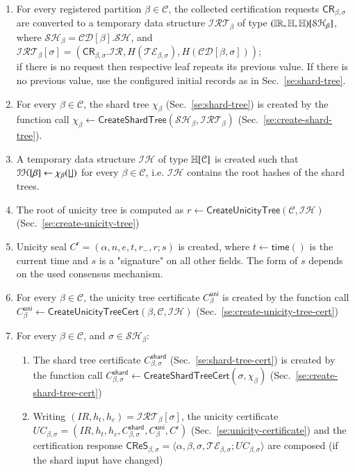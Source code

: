 \begin{enumerate}
	\item For every registered partition $\beta\in\mathcal{C}$, the collected certification requests $\mathsf{CR}_{\beta,\sigma}$ are converted to a temporary data structure $\mathcal{IRT}_\beta$ of type $(\mathbb{IR},\mathbb{H},\mathbb{H})[\mathcal{SH}_\beta]$, where $\mathcal{SH}_\beta=\mathcal{CD}[\beta].\mathcal{SH}$,
	and $\mathcal{IRT}_\beta[\sigma]=(\mathsf{CR}_{\beta,\sigma}.\mathcal{IR}, H(\mathcal{TE}_{\beta,\sigma}),H(\mathcal{CD}[\beta,\sigma]))$; \\
	if there is no request then respective leaf repeats its previous value. If there is no previous value, use the configured initial records as in Sec.~\ref{se:shard-tree}.
	\item For every $\beta\in\mathcal{C}$, the shard tree $\chi_\beta$  (Sec.~\ref{se:shard-tree}) is created by the function call $\chi_\beta\gets\mathsf{CreateShardTree}(\mathcal{SH}_\beta,\mathcal{IRT}_\beta)$ (Sec.~\ref{se:create-shard-tree}).
	\item A temporary data structure $\mathcal{IH}$ of type $\mathbb{H}[\mathcal{C}]$ is created such that $\mathcal{IH}[\beta]\gets \chi_\beta(\lfloor\!\rfloor)$ for every $\beta\in\mathcal{C}$, i.e. $\mathcal{IH}$ contains the root hashes of the shard trees.
	\item The root of unicity tree is computed as $r \gets \mathsf{CreateUnicityTree}(\mathcal{C}, \mathcal{IH})$ (Sec.~\ref{se:create-unicity-tree})
	\item Unicity seal $C^\mathsf{r}=(\alpha, n, e, t, r_-,r; s )$ is created, where $t\gets\mathsf{time}()$ is the current time and $s$ is a "signature" on all other fields. The form of $s$ depends on the used consensus mechanism.
	\item For every $\beta\in\mathcal{C}$, the unicity tree certificate $C^\mathsf{uni}_\beta$ is created by the function call $C^\mathsf{uni}_\beta\gets \mathsf{CreateUnicityTreeCert}(\beta, \mathcal{C}, \mathcal{IH})$ (Sec.~\ref{se:create-unicity-tree-cert})
	\item For every $\beta\in\mathcal{C}$, and $\sigma\in \mathcal{SH}_\beta$:
	\begin{enumerate}
		\item The shard tree certificate $C^\mathsf{shard}_{\beta,\sigma}$ (Sec.~\ref{se:shard-tree-cert}) is created by the function call $C^\mathsf{shard}_{\beta,\sigma}\gets \mathsf{CreateShardTreeCert}(\sigma,\chi_\beta)$ (Sec.~\ref{se:create-shard-tree-cert})
		\item Writing $(IR,h_t,h_c)=\mathcal{IRT}_\beta[\sigma]$, the unicity certificate $UC_{\beta,\sigma}=(IR,h_t,h_c,C^\mathsf{shard}_{\beta,\sigma},C^\mathsf{uni}_\beta,C^\mathsf{r})$ (Sec.~\ref{se:unicity-certificate}) and the certification response $\mathsf{CReS}_{\beta,\sigma}=\langle \alpha,\beta,\sigma,\mathcal{TE}_{\beta,\sigma}; UC_{\beta,\sigma}\rangle$ are composed (if the shard input have changed)

\end{enumerate}
\end{enumerate}
